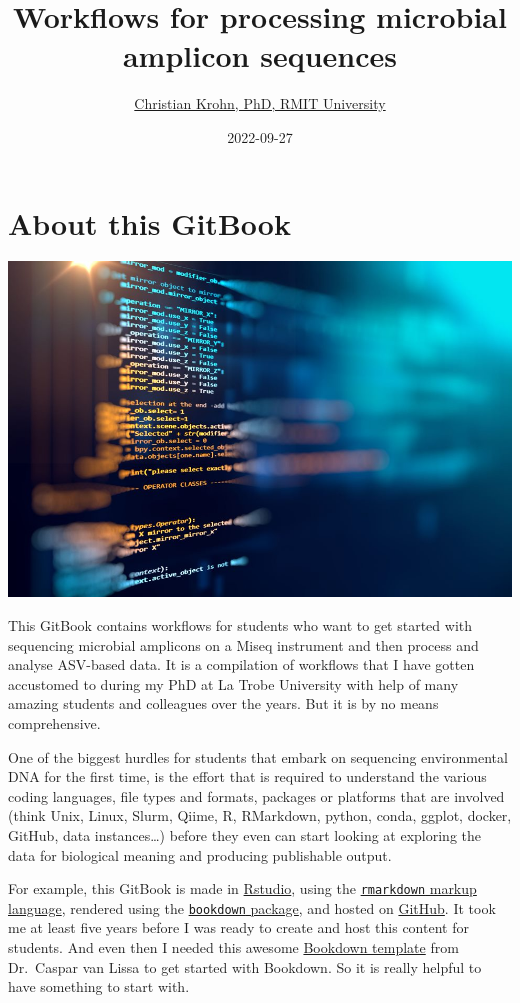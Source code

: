 \documentclass[
]{book}
\title{Workflows for processing microbial amplicon sequences}
\author{\href{https://www.rmit.edu.au/contact/staff-contacts/academic-staff/k/krohn---christian}{Christian Krohn, PhD, RMIT University}}
\date{2022-09-27}
\begin{document}
\maketitle

{
\setcounter{tocdepth}{1}
\tableofcontents
}
\hypertarget{about}{%
\chapter{About this GitBook}\label{about}}

\includegraphics{./img/data.jpeg}

This GitBook contains workflows for students who want to get started with sequencing microbial amplicons on a Miseq instrument and then process and analyse ASV-based data. It is a compilation of workflows that I have gotten accustomed to during my PhD at La Trobe University with help of many amazing students and colleagues over the years. But it is by no means comprehensive.

One of the biggest hurdles for students that embark on sequencing environmental DNA for the first time, is the effort that is required to understand the various coding languages, file types and formats, packages or platforms that are involved (think Unix, Linux, Slurm, Qiime, R, RMarkdown, python, conda, ggplot, docker, GitHub, data instances\ldots) before they even can start looking at exploring the data for biological meaning and producing publishable output.

For example, this GitBook is made in \href{https://rstudio.com}{Rstudio}, using the \href{https://rstudio.com/wp-content/uploads/2016/03/rmarkdown-cheatsheet-2.0.pdf}{\texttt{rmarkdown} markup language}, rendered using the \href{https://bookdown.org/yihui/bookdown/get-started.html}{\texttt{bookdown} package}, and hosted on \href{https://github.com/}{GitHub}. It took me at least five years before I was ready to create and host this content for students. And even then I needed this awesome \href{https://cjvanlissa.github.io/gitbook-demo/index.html}{Bookdown template} from Dr.~Caspar van Lissa to get started with Bookdown. So it is really helpful to have something to start with.
\end{document}
